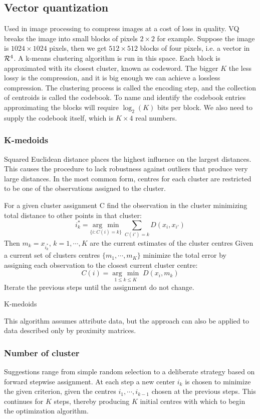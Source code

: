 \documentclass[12pt, letterpaper]{article}
\theoremstyle{definition}
\newcommand{\argmin}[1]{\underset{#1}{\operatorname{arg}\,\operatorname{min}}\;}
\begin{document}
\subsection{Vector quantization}
Used in image processing to compress images at a cost of loss in quality. VQ breaks the image into small blocks of pixels $2 \times 2$ for example. Suppose the image is $1024 \times 1024$ pixels, then we get $512\times 512$ blocks of four pixels, i.e. a vector in $\CMcal{R}^4$. A k-means clustering algorithm is run in this space.  Each block is approximated with its closest cluster, known as codeword. The bigger $K$ the less lossy is the compression, and it is big enough we can achieve a lossless compression. The clustering process is called the encoding step, and the collection of centroids is called the codebook. To name and identify the codebook entries approximating the blocks will require $\log_2(K)$ bits per block. We also need to supply the codebook itself, which is $K \times 4$ real numbers.

\subsubsection{K-medoids}
Squared Euclidean distance places the highest influence on the largest distances. This causes the procedure to lack robustness against outliers that produce very large distances.  In the most common form, centres for each cluster are restricted to be one of the observations assigned to the cluster.
\begin{algorithm}
For a given cluster assignment C find the observation in the cluster
minimizing total distance to other points in that cluster:
\begin{equation}
i_k^* = \argmin{\{i:C(i) = k\}} \sum_{C(i')=k}D(x_i, x_{i'})
\end{equation}
Then $m_k=x_{i_k^*}$, $k=1,\cdots, K$ are the current estimates of the cluster centres\;
Given a current set of clusters centres $\{m_1, \cdots, m_K\}$ minimize the total error by assigning each observation to the closest current cluster centre:
\begin{equation}
C(i) = \argmin{1\le k\le K}{D(x_i, m_k)}
\end{equation}\;
Iterate the previous steps until the assignment do not change.
\caption{K-medoids}
\end{algorithm}
This algorithm assumes attribute data, but the approach can also be applied to data described only by proximity matrices.

\subsubsection{Number of cluster}
Suggestions range from simple random selection to a deliberate strategy based on forward stepwise assignment. At each step a new center $i_k$ is chosen to minimize the given criterion, given the centres $i_1, \cdots, i_{k-1}$ chosen at the previous steps. This continues for $K$ steps, thereby producing $K$ initial centres with which to begin the optimization algorithm.
\end{document}
